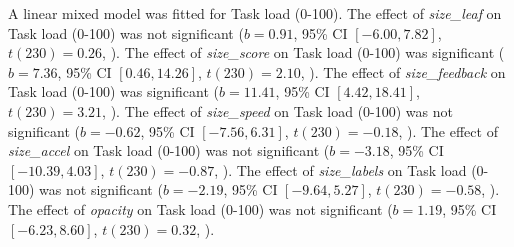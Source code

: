 A linear mixed model was fitted for Task load (0-100).
The effect of \textit{size\_leaf} on Task load (0-100) was not significant ($b = 0.91$, 95\% CI $[-6.00, 7.82]$, $t(230) = 0.26$, ).
The effect of \textit{size\_score} on Task load (0-100) was significant ($b = 7.36$, 95\% CI $[0.46, 14.26]$, $t(230) = 2.10$, ).
The effect of \textit{size\_feedback} on Task load (0-100) was significant ($b = 11.41$, 95\% CI $[4.42, 18.41]$, $t(230) = 3.21$, ).
The effect of \textit{size\_speed} on Task load (0-100) was not significant ($b = -0.62$, 95\% CI $[-7.56, 6.31]$, $t(230) = -0.18$, ).
The effect of \textit{size\_accel} on Task load (0-100) was not significant ($b = -3.18$, 95\% CI $[-10.39, 4.03]$, $t(230) = -0.87$, ).
The effect of \textit{size\_labels} on Task load (0-100) was not significant ($b = -2.19$, 95\% CI $[-9.64, 5.27]$, $t(230) = -0.58$, ).
The effect of \textit{opacity} on Task load (0-100) was not significant ($b = 1.19$, 95\% CI $[-6.23, 8.60]$, $t(230) = 0.32$, ).
